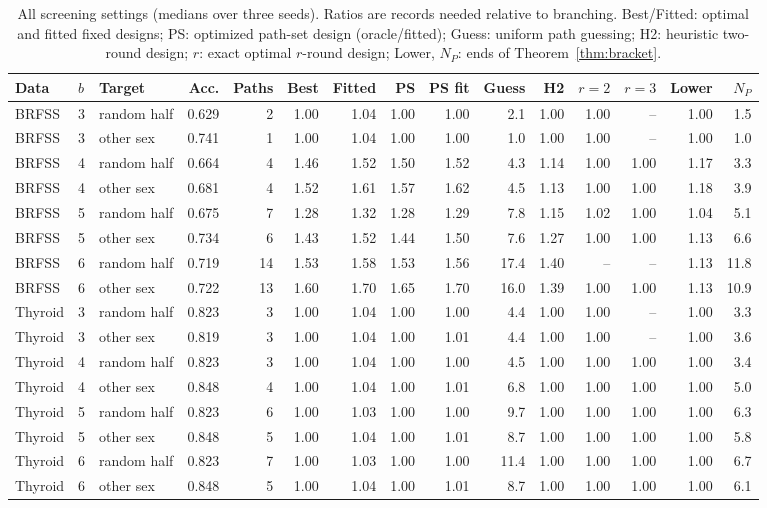\begin{table}[h]
\centering
\caption{All screening settings (medians over three seeds). Ratios are records needed relative to branching. Best/Fitted: optimal and fitted fixed designs; PS: optimized path-set design (oracle/fitted); Guess: uniform path guessing; H2: heuristic two-round design; $r$: exact optimal $r$-round design; Lower, $N_P$: ends of Theorem~\ref{thm:bracket}.}
\label{tab:screeningdetail}
\scriptsize
\setlength{\tabcolsep}{2.2pt}
\begin{tabular}{lllrrrrrrrrrrrr}
\toprule
Data & $b$ & Target & Acc. & Paths & Best & Fitted & PS & PS fit & Guess & H2 & $r{=}2$ & $r{=}3$ & Lower & $N_P$ \\
\midrule
BRFSS & 3 & random half & 0.629 & 2 & 1.00 & 1.04 & 1.00 & 1.00 & 2.1 & 1.00 & 1.00 & -- & 1.00 & 1.5 \\
BRFSS & 3 & other sex & 0.741 & 1 & 1.00 & 1.04 & 1.00 & 1.00 & 1.0 & 1.00 & 1.00 & -- & 1.00 & 1.0 \\
BRFSS & 4 & random half & 0.664 & 4 & 1.46 & 1.52 & 1.50 & 1.52 & 4.3 & 1.14 & 1.00 & 1.00 & 1.17 & 3.3 \\
BRFSS & 4 & other sex & 0.681 & 4 & 1.52 & 1.61 & 1.57 & 1.62 & 4.5 & 1.13 & 1.00 & 1.00 & 1.18 & 3.9 \\
BRFSS & 5 & random half & 0.675 & 7 & 1.28 & 1.32 & 1.28 & 1.29 & 7.8 & 1.15 & 1.02 & 1.00 & 1.04 & 5.1 \\
BRFSS & 5 & other sex & 0.734 & 6 & 1.43 & 1.52 & 1.44 & 1.50 & 7.6 & 1.27 & 1.00 & 1.00 & 1.13 & 6.6 \\
BRFSS & 6 & random half & 0.719 & 14 & 1.53 & 1.58 & 1.53 & 1.56 & 17.4 & 1.40 & -- & -- & 1.13 & 11.8 \\
BRFSS & 6 & other sex & 0.722 & 13 & 1.60 & 1.70 & 1.65 & 1.70 & 16.0 & 1.39 & 1.00 & 1.00 & 1.13 & 10.9 \\
Thyroid & 3 & random half & 0.823 & 3 & 1.00 & 1.04 & 1.00 & 1.00 & 4.4 & 1.00 & 1.00 & -- & 1.00 & 3.3 \\
Thyroid & 3 & other sex & 0.819 & 3 & 1.00 & 1.04 & 1.00 & 1.01 & 4.4 & 1.00 & 1.00 & -- & 1.00 & 3.6 \\
Thyroid & 4 & random half & 0.823 & 3 & 1.00 & 1.04 & 1.00 & 1.00 & 4.5 & 1.00 & 1.00 & 1.00 & 1.00 & 3.4 \\
Thyroid & 4 & other sex & 0.848 & 4 & 1.00 & 1.04 & 1.00 & 1.01 & 6.8 & 1.00 & 1.00 & 1.00 & 1.00 & 5.0 \\
Thyroid & 5 & random half & 0.823 & 6 & 1.00 & 1.03 & 1.00 & 1.00 & 9.7 & 1.00 & 1.00 & 1.00 & 1.00 & 6.3 \\
Thyroid & 5 & other sex & 0.848 & 5 & 1.00 & 1.04 & 1.00 & 1.01 & 8.7 & 1.00 & 1.00 & 1.00 & 1.00 & 5.8 \\
Thyroid & 6 & random half & 0.823 & 7 & 1.00 & 1.03 & 1.00 & 1.00 & 11.4 & 1.00 & 1.00 & 1.00 & 1.00 & 6.7 \\
Thyroid & 6 & other sex & 0.848 & 5 & 1.00 & 1.04 & 1.00 & 1.01 & 8.7 & 1.00 & 1.00 & 1.00 & 1.00 & 6.1 \\
\bottomrule
\end{tabular}
\end{table}
